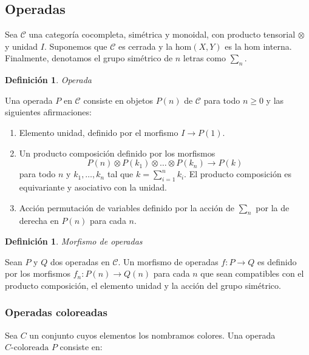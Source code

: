 \documentclass[11pt,a4paper,openright,oneside]{article}
\numberwithin{equation}{section}
\newtheorem{defi}[teo]{Definici\'on}
\theoremstyle{definition}
\begin{document}
\subsection{Operadas}
Sea $\mathcal{C}$ una categor\'ia cocompleta, sim\'etrica y monoidal, con producto tensorial $\otimes$ y unidad $I$. %
Suponemos que $\mathcal{C}$ es cerrada y la $\text{hom}(X, Y)$ es la $\text{hom}$ interna. Finalmente, denotamos el grupo sim\'etrico de $n$ letras como $\sum_n$.
\begin{defi}
    Operada
\end{defi}
Una operada $P$ en $\mathcal{C}$ consiste en objetos $P(n)$ de $\mathcal{C}$ para todo $n\ge 0$ y las siguientes afirmaciones: %

\begin{enumerate}[(1)]
    \item Elemento unidad, definido por el morfismo $I \longrightarrow P(1)$.
    \item Un producto composici\'on definido por los morfismos
          $$
              P(n)\otimes P(k_1) \otimes\dots\otimes P(k_n)\longrightarrow P(k)
          $$
          para todo $n$ y $k_1,\dots,k_n$ tal que $k=\sum_{i=1}^{n}{k_i}$. El producto composici\'on es equivariante y asociativo con la unidad.
    \item Acci\'on permutaci\'on de variables definido por la acci\'on de $\sum_n$ por la de derecha en $P(n)$ para cada $n$.
\end{enumerate}

\begin{defi}
    Morfismo de operadas
\end{defi}
Sean $P$ y $Q$ dos operadas en $\mathcal{C}$. Un morfismo de operadas $f: P \longrightarrow Q$ es definido por los morfismos $f_n: P(n)\longrightarrow Q(n)$ para cada $n$
que sean compatibles con el producto composici\'on, el elemento unidad y la acci\'on del grupo sim\'etrico.


\subsubsection{Operadas coloreadas}
Sea $C$ un conjunto cuyos elementos los nombramos colores. Una operada $C\text{-coloreada}$ $P$ consiste en:
\end{document}
